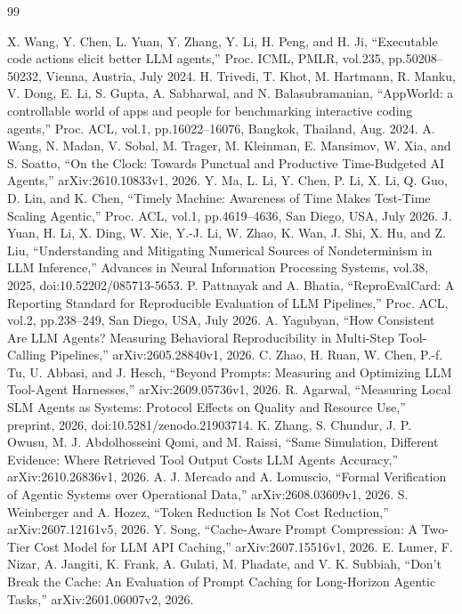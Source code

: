 \documentclass[uplatex,a4paper,twocolumn,10pt]{jsarticle}
\begin{document}
\begin{thebibliography}{99}
\raggedright
{} X. Wang, Y. Chen, L. Yuan, Y. Zhang, Y. Li, H. Peng, and H. Ji, ``Executable code actions elicit better LLM agents,'' Proc. ICML, PMLR, vol.235, pp.50208--50232, Vienna, Austria, July 2024.
 H. Trivedi, T. Khot, M. Hartmann, R. Manku, V. Dong, E. Li, S. Gupta, A. Sabharwal, and N. Balasubramanian, ``AppWorld: a controllable world of apps and people for benchmarking interactive coding agents,'' Proc. ACL, vol.1, pp.16022--16076, Bangkok, Thailand, Aug. 2024.
 A. Wang, N. Madan, V. Sobal, M. Trager, M. Kleinman, E. Mansimov, W. Xia, and S. Soatto, ``On the Clock: Towards Punctual and Productive Time-Budgeted AI Agents,'' arXiv:2610.10833v1, 2026.
 Y. Ma, L. Li, Y. Chen, P. Li, X. Li, Q. Guo, D. Lin, and K. Chen, ``Timely Machine: Awareness of Time Makes Test-Time Scaling Agentic,'' Proc. ACL, vol.1, pp.4619--4636, San Diego, USA, July 2026.
 J. Yuan, H. Li, X. Ding, W. Xie, Y.-J. Li, W. Zhao, K. Wan, J. Shi, X. Hu, and Z. Liu, ``Understanding and Mitigating Numerical Sources of Nondeterminism in LLM Inference,'' Advances in Neural Information Processing Systems, vol.38, 2025, doi:10.52202/085713-5653.
 P. Pattnayak and A. Bhatia, ``ReproEvalCard: A Reporting Standard for Reproducible Evaluation of LLM Pipelines,'' Proc. ACL, vol.2, pp.238--249, San Diego, USA, July 2026.
 A. Yagubyan, ``How Consistent Are LLM Agents? Measuring Behavioral Reproducibility in Multi-Step Tool-Calling Pipelines,'' arXiv:2605.28840v1, 2026.
 C. Zhao, H. Ruan, W. Chen, P.-f. Tu, U. Abbasi, and J. Hesch, ``Beyond Prompts: Measuring and Optimizing LLM Tool-Agent Harnesses,'' arXiv:2609.05736v1, 2026.
 R. Agarwal, ``Measuring Local SLM Agents as Systems: Protocol Effects on Quality and Resource Use,'' preprint, 2026, doi:10.5281/zenodo.21903714.
 K. Zhang, S. Chundur, J. P. Owusu, M. J. Abdolhosseini Qomi, and M. Raissi, ``Same Simulation, Different Evidence: Where Retrieved Tool Output Costs LLM Agents Accuracy,'' arXiv:2610.26836v1, 2026.
 A. J. Mercado and A. Lomuscio, ``Formal Verification of Agentic Systems over Operational Data,'' arXiv:2608.03609v1, 2026.
 S. Weinberger and A. Hozez, ``Token Reduction Is Not Cost Reduction,'' arXiv:2607.12161v5, 2026.
 Y. Song, ``Cache-Aware Prompt Compression: A Two-Tier Cost Model for LLM API Caching,'' arXiv:2607.15516v1, 2026.
 E. Lumer, F. Nizar, A. Jangiti, K. Frank, A. Gulati, M. Phadate, and V. K. Subbiah, ``Don't Break the Cache: An Evaluation of Prompt Caching for Long-Horizon Agentic Tasks,'' arXiv:2601.06007v2, 2026.
\end{thebibliography}
\end{document}
